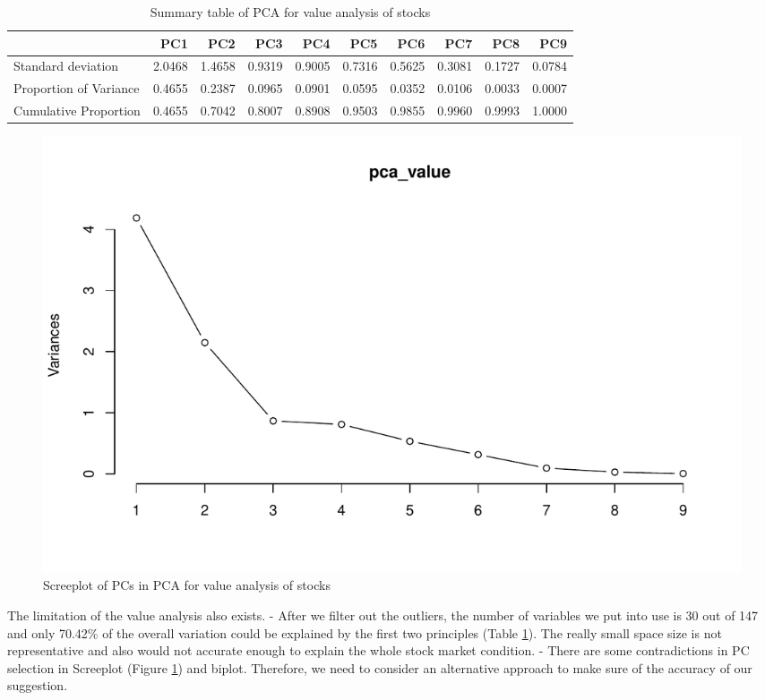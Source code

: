 \documentclass[11pt,a4paper,]{article}
\begin{document}
\begin{table}

\caption{\label{tab:lim-1}Summary table of PCA for value analysis of stocks}
\centering
\begin{tabular}[t]{>{\raggedright\arraybackslash}p{70px}|r|r|r|r|r|r|r|r|r}
\hline
  & PC1 & PC2 & PC3 & PC4 & PC5 & PC6 & PC7 & PC8 & PC9\\
\hline
Standard deviation & 2.0468 & 1.4658 & 0.9319 & 0.9005 & 0.7316 & 0.5625 & 0.3081 & 0.1727 & 0.0784\\
\hline
Proportion of Variance & 0.4655 & 0.2387 & 0.0965 & 0.0901 & 0.0595 & 0.0352 & 0.0106 & 0.0033 & 0.0007\\
\hline
Cumulative Proportion & 0.4655 & 0.7042 & 0.8007 & 0.8908 & 0.9503 & 0.9855 & 0.9960 & 0.9993 & 1.0000\\
\hline
\end{tabular}
\end{table}

\begin{figure}
\centering
\includegraphics{ass2_files/figure-latex/lim-2-1.pdf}
\caption{\label{fig:lim-2}Screeplot of PCs in PCA for value analysis of stocks}
\end{figure}

The limitation of the value analysis also exists.
- After we filter out the outliers, the number of variables we put into use is 30 out of 147 and only 70.42\% of the overall variation could be explained by the first two principles (Table \ref{tab:lim-1}). The really small space size is not representative and also would not accurate enough to explain the whole stock market condition.
- There are some contradictions in PC selection in Screeplot (Figure \ref{fig:lim-2}) and biplot.
Therefore, we need to consider an alternative approach to make sure of the accuracy of our suggestion.
\end{document}
